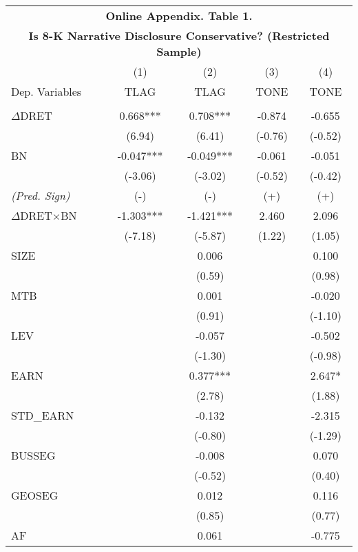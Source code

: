 \begin{table}[H] \label{OAT1}
	\begin{center}
		\tabcolsep=0.11cm
		\begin{tabular}{lcccc}
			\multicolumn{5}{c}{\textbf{Online Appendix. Table 1. }} \\
			\multicolumn{5}{c}{\textbf{Is 8-K Narrative Disclosure Conservative? (Restricted Sample)}} \\
			\toprule
			\toprule
			& (1) & (2) & (3) & (4) \\
			Dep. Variables & TLAG & TLAG & TONE & TONE \\
			\midrule
			&   &   &   &  \\
			$\Delta$DRET & 0.668*** & 0.708*** & -0.874 & -0.655 \\
			& (6.94) & (6.41) & (-0.76) & (-0.52) \\
			BN & -0.047*** & -0.049*** & -0.061 & -0.051 \\
			& (-3.06) & (-3.02) & (-0.52) & (-0.42) \\
			\rowcolor[rgb]{ .906,  .902,  .902} \textit{(Pred. Sign)} & (-) & (-) & (+) & (+) \\
			\rowcolor[rgb]{ .906,  .902,  .902} $\Delta$DRET$\times$BN & -1.303*** & -1.421*** & 2.460 & 2.096 \\
			\rowcolor[rgb]{ .906,  .902,  .902} & (-7.18) & (-5.87) & (1.22) & (1.05) \\
			SIZE &   & 0.006 &   & 0.100 \\
			&   & (0.59) &   & (0.98) \\
			MTB &   & 0.001 &   & -0.020 \\
			&   & (0.91) &   & (-1.10) \\
			LEV &   & -0.057 &   & -0.502 \\
			&   & (-1.30) &   & (-0.98) \\
			EARN &   & 0.377*** &   & 2.647* \\
			&   & (2.78) &   & (1.88) \\
			STD\_EARN &   & -0.132 &   & -2.315 \\
			&   & (-0.80) &   & (-1.29) \\
			BUSSEG &   & -0.008 &   & 0.070 \\
			&   & (-0.52) &   & (0.40) \\
			GEOSEG &   & 0.012 &   & 0.116 \\
			&   & (0.85) &   & (0.77) \\
			AF &   & 0.061 &   & -0.775 \\

\end{tabular}
\end{center}
\end{table}
